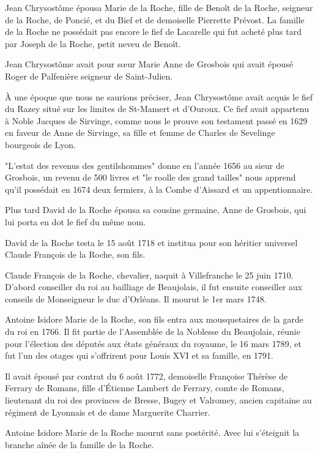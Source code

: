 Jean Chrysostôme épousa Marie de la Roche, fille de Benoît de la Roche, seigneur de la Roche, de Poncié, et du Bief et de demoiselle Pierrette Prévost. La famille de la Roche ne possédait pas encore le fief de Lacarelle qui fut acheté plus tard par Joseph de la Roche, petit neveu de Benoît.

Jean Chrysostôme avait pour sœur Marie Anne de Grosbois qui avait épousé Roger de Palfenière seigneur de Saint-Julien.

À une époque que nous ne saurions préciser, Jean Chrysostôme avait acquis le fief du Razey situé sur les limites de St-Mamert et d'Ouroux. Ce fief avait appartenu à Noble Jacques de Sirvinge, comme nous le prouve son testament passé en 1629 en faveur de Anne de Sirvinge, sa fille et femme de Charles de Sevelinge bourgeois de Lyon.

"L'estat des revenus des gentilshommes" donne en l'année 1656 au sieur de Grosbois, un revenu de 500 livres et "le roolle des grand tailles" nous apprend qu'il possédait en 1674 deux fermiers, à la Combe d'Aissard et un appentionnaire.

Plus tard David de la Roche épousa sa cousine germaine, Anne de Grosbois, qui lui porta en dot le fief du même nom.

David de la Roche testa le 15 août 1718 et institua pour son héritier universel Claude François de la Roche, son fils.

Claude François de la Roche, chevalier, naquit à Villefranche le 25 juin 1710. D'abord conseiller du roi au bailliage de Beaujolais, il fut ensuite conseiller aux conseils de Monseigneur le duc d'Orléans. Il mourut le 1er mars 1748.

Antoine Isidore Marie de la Roche, son fils entra aux mousquetaires de la garde du roi en 1766. Il fit partie de l'Assemblée de la Noblesse du Beaujolais, réunie pour l'élection des députés aux états généraux du royaume, le 16 mars 1789, et fut l'un des otages qui s'offrirent pour Louis XVI et sa famille, en 1791.

Il avait épousé par contrat du 6 août 1772, demoiselle Françoise Thérèse de Ferrary de Romans, fille d'Étienne Lambert de Ferrary, comte de Romans, lieutenant du roi des provinces de Bresse, Bugey et Valromey, ancien capitaine au régiment de Lyonnais et de dame Marguerite Charrier.

Antoine Isidore Marie de la Roche mourut sans postérité. Avec lui s'éteignit la branche aînée de la famille de la Roche.

